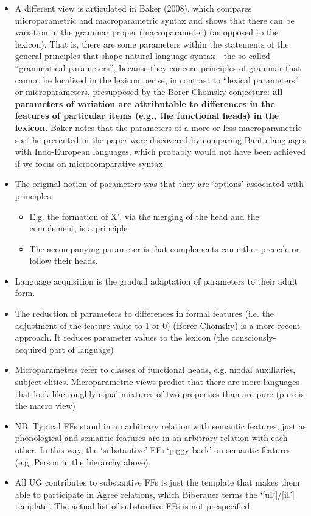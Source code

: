 \documentclass{article}
\begin{document}
\begin{itemize}
    \item A different view is articulated in Baker (2008), which compares microparametric and macroparametric syntax and shows that there can be variation in the grammar proper (macroparameter) (as opposed to the lexicon). That is, there are some parameters within the statements of the general principles that shape natural language syntax—the so-called “grammatical parameters”, because they concern principles of grammar that cannot be localized in the lexicon per se, in contrast to “lexical parameters” or microparameters, presupposed by the Borer-Chomsky conjecture: \textbf{all parameters of variation are attributable to differences in the features of particular items (e.g., the functional heads) in the lexicon.} Baker notes that the parameters of a more or less macroparametric sort he presented in the paper were discovered by comparing Bantu languages with Indo-European languages, which probably would not have been achieved if we focus on microcomparative syntax.
    \item The original notion of parameters was that they are `options' associated with principles.
    \begin{itemize}
        \item E.g. the formation of X', via the merging of the head and the complement, is a principle
        \item The accompanying parameter is that complements can either precede or follow their heads.
    \end{itemize}
    \item Language acquisition is the gradual adaptation of parameters to their adult form.
    \item The reduction of parameters to differences in formal features (i.e. the adjustment of the feature value to 1 or 0) (Borer-Chomsky) is a more recent approach. It reduces parameter values to the lexicon (the consciously-acquired part of language)
    \item Microparameters refer to classes of functional heads, e.g. modal auxiliaries, subject clitics. Microparametric views predict that there are more languages that look like roughly equal mixtures of two properties than are pure (pure is the macro view)
    \item NB. Typical FFs stand in an arbitrary relation with semantic features, just as phonological and semantic features are in an arbitrary relation with each other. In this way, the ‘substantive’ FFs ‘piggy-back’ on semantic features (e.g. Person in the hierarchy above).
    \item All UG contributes to substantive FFs is just the template that makes them able to participate in Agree relations, which Biberauer terms the ‘[uF]/[iF] template’. The actual list of substantive FFs is not prespecified.  
\end{itemize}
\end{document}
